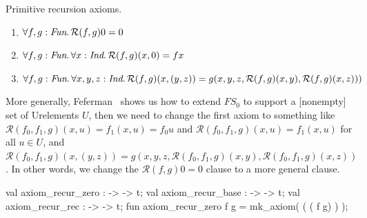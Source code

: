 \begin{node}
Primitive recursion axioms.
\begin{enumerate}
  \item $\forall f,g:\textit{Fun}\ldotp \mathcal{R}(f,g)0=0$
  \item $\forall f,g:\textit{Fun}\ldotp \forall x:\textit{Ind}\ldotp \mathcal{R}(f,g)(x,0)=fx$
  \item $\forall f,g:\textit{Fun}\ldotp\forall x,y,z:\textit{Ind}\ldotp \mathcal{R}(f,g)(x,(y,z))=g(x,y,z,\mathcal{R}(f,g)(x,y),\mathcal{R}(f,g)(x,z)))$
\end{enumerate}
More generally, Feferman~\cite[\S5.2]{feferman1982inductively} shows
us how to extend $FS_{0}$ to support a [nonempty] set of
Urelements $U$, then we need to change the first axiom to something
like $\mathcal{R}(f_{0},f_{1},g)(x,u)=f_{1}(x,u)=f_{0}u$ and
$\mathcal{R}(f_{0},f_{1},g)(x,u)=f_{1}(x,u)$ for all $u\in U$, and
$\mathcal{R}(f_{0},f_{1},g)(x,(y,z))=g(x,y,z,\mathcal{R}(f_{0},f_{1},g)(x,y),\mathcal{R}(f_{0},f_{1},g)(x,z))$. In
other words, we change the $\mathcal{R}(f,g)0=0$ clause to a more
general clause.
\end{node}

\nwenddocs{}\plusendmoddef\nwstartdeflinemarkup{}\nwenddeflinemarkup
val axiom_recur_zero :  ->  -> t;
val axiom_recur_base :  ->  -> t;
val axiom_recur_rec :  ->  -> t;
\nwendcode{}\nwdocspar
\nwenddocs{}\plusendmoddef\nwstartdeflinemarkup{}\nwenddeflinemarkup
fun axiom_recur_zero f g =
  mk_axiom( ( ( f g) )
                     );


